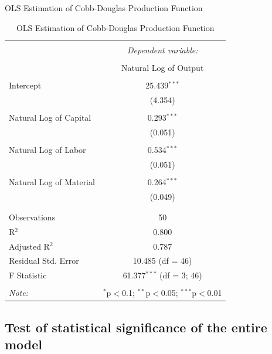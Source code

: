 \documentclass[
]{book}
\theoremstyle{definition}
\theoremstyle{definition}
\theoremstyle{definition}
\theoremstyle{definition}
\theoremstyle{remark}
\begin{document}
\label{tab:ch4table2} OLS Estimation of Cobb-Douglas Production Function

\begin{table}[!htbp] \centering 
  \caption{OLS Estimation of Cobb-Douglas Production Function} 
  \label{} 
\begin{tabular}{@{\extracolsep{5pt}}lc} 
\\[-1.8ex]\hline 
\hline \\[-1.8ex] 
 & \multicolumn{1}{c}{\textit{Dependent variable:}} \\ 
\cline{2-2} 
\\[-1.8ex] & Natural Log of Output \\ 
\hline \\[-1.8ex] 
 Intercept & 25.439$^{***}$ \\ 
  & (4.354) \\ 
  & \\ 
 Natural Log of Capital & 0.293$^{***}$ \\ 
  & (0.051) \\ 
  & \\ 
 Natural Log of Labor & 0.534$^{***}$ \\ 
  & (0.051) \\ 
  & \\ 
 Natural Log of Material & 0.264$^{***}$ \\ 
  & (0.049) \\ 
  & \\ 
\hline \\[-1.8ex] 
Observations & 50 \\ 
R$^{2}$ & 0.800 \\ 
Adjusted R$^{2}$ & 0.787 \\ 
Residual Std. Error & 10.485 (df = 46) \\ 
F Statistic & 61.377$^{***}$ (df = 3; 46) \\ 
\hline 
\hline \\[-1.8ex] 
\textit{Note:}  & \multicolumn{1}{r}{$^{*}$p$<$0.1; $^{**}$p$<$0.05; $^{***}$p$<$0.01} \\ 
\end{tabular} 
\end{table}

\hypertarget{test-of-statistical-significance-of-the-entire-model}{%
\subsection{Test of statistical significance of the entire model}\label{test-of-statistical-significance-of-the-entire-model}}
\end{document}
